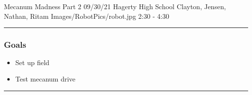 \insertmeeting 
	{Mecanum Madness Part 2} 
	{09/30/21}
	{Hagerty High School}
	{Clayton, Jensen, Nathan, Ritam}
	{Images/RobotPics/robot.jpg}
	{2:30 - 4:30}
	
\noindent\hfil\rule{\textwidth}{.4pt}\hfil
\subsubsection*{Goals}
\begin{itemize}
    \item Set up field
    \item Test mecanum drive
 

\end{itemize} 

\noindent\hfil\rule{\textwidth}{.4pt}\hfil

